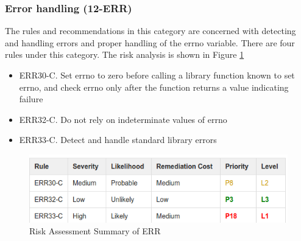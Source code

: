	\subsubsection{Error handling (12-ERR)} The rules and recommendations in this category are concerned with detecting and handling errors and proper handling of the errno variable.  There are four rules under this category. The risk analysis is shown in Figure \ref{fig:13}\cite{cert-c}
	\begin{itemize}
		\item ERR30-C. Set errno to zero before calling a library function known to set errno, and check errno only after the function returns a value indicating failure
		
		\item ERR32-C. Do not rely on indeterminate values of errno
		
		\item ERR33-C. Detect and handle standard library errors
			\end{itemize}
			\begin{figure}[H]
				
				
				\centering
				\includegraphics[width=.6\linewidth]{Figures/err}
				\caption{Risk Assessment Summary of ERR}
				\label{fig:13}
				
			\end{figure}
